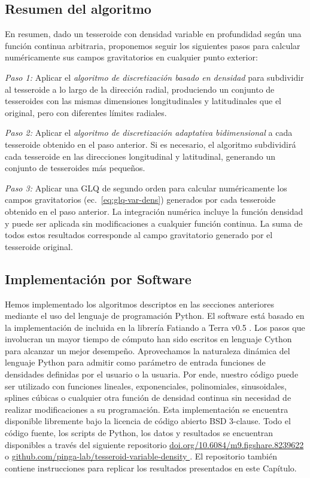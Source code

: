 \subsection{Resumen del algoritmo}

En resumen, dado un tesseroide con densidad variable en profundidad según una
función continua arbitraria, proponemos seguir los siguientes pasos para
calcular numéricamente sus campos gravitatorios en cualquier punto exterior:

\textit{Paso 1:}
Aplicar el \emph{algoritmo de discretización basado en densidad} para
subdividir al tesseroide a lo largo de la dirección radial, produciendo un
conjunto de tesseroides con las mismas dimensiones longitudinales
y latitudinales que el original, pero con diferentes límites radiales.

\textit{Paso 2:}
Aplicar el \emph{algoritmo de discretización adaptativa bidimensional} a cada
tesseroide obtenido en el paso anterior.
Si es necesario, el algoritmo subdividirá cada tesseroide en las direcciones
longitudinal y latitudinal, generando un conjunto de tesseroides más pequeños.

\textit{Paso 3:}
Aplicar una \ac{GLQ} de segundo orden para calcular numéricamente los campos
gravitatorios (ec.~\ref{eq:glq-var-dens}) generados por cada tesseroide
obtenido en el paso anterior. La integración numérica incluye la función
densidad y puede ser aplicada sin modificaciones a cualquier función continua.
La suma de todos estos resultados corresponde al campo gravitatorio generado
por el tesseroide original.


\subsection{Implementación por Software}

Hemos implementado los algoritmos descriptos en las secciones anteriores
mediante el uso del lenguaje de programación Python.
El software está basado en la implementación de \citet{uieda2016} incluida en
la librería Fatiando a Terra v0.5 \citep{uieda2013}.
Los pasos que involucran un mayor tiempo de cómputo han sido escritos en
lenguaje Cython para alcanzar un mejor desempeño.
Aprovechamos la naturaleza dinámica del lenguaje Python para admitir como
parámetro de entrada funciones de densidades definidas por el usuario o la
usuaria.
Por ende, nuestro código puede ser utilizado con funciones lineales,
exponenciales, polinomiales, sinusoidales, splines cúbicas o cualquier otra
función de densidad continua sin necesidad de realizar modificaciones a su
programación.
Esta implementación se encuentra disponible libremente bajo la licencia
de código abierto BSD 3-clause.
Todo el código fuente, los scripts de Python, los datos y resultados se
encuentran disponibles a través del siguiente repositorio
\href{
    https://doi.org/10.6084/m9.figshare.8239622
}{
    doi.org/10.6084/m9.figshare.8239622
}
\citep{soler2019b} o
\href{
    https://github.com/pinga-lab/tesseroid-variable-density
}{
    github.com/pinga-lab/tesseroid-variable-density
}.
El repositorio también contiene instrucciones para replicar los resultados
presentados en este Capítulo.



